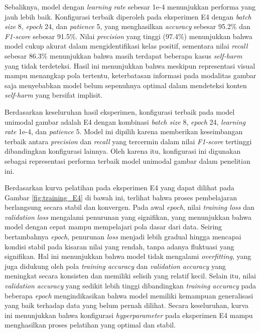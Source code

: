 Sebaliknya, model dengan \textit{learning rate} sebesar 1e-4 menunjukkan performa yang jauh lebih baik. Konfigurasi terbaik diperoleh pada eksperimen E4 dengan \textit{batch size} 8, \textit{epoch} 24, dan \textit{patience} 5, yang menghasilkan \textit{accuracy} sebesar 95.2\% dan \textit{F1-score} sebesar 91.5\%. Nilai \textit{precision} yang tinggi (97.4\%) menunjukkan bahwa model cukup akurat dalam mengidentifikasi kelas positif, sementara nilai \textit{recall} sebesar 86.3\% menunjukkan bahwa masih terdapat beberapa kasus \textit{self-harm} yang tidak terdeteksi. Hasil ini menunjukkan bahwa meskipun representasi visual mampu menangkap pola tertentu, keterbatasan informasi pada modalitas gambar saja menyebabkan model belum sepenuhnya optimal dalam mendeteksi konten \textit{self-harm} yang bersifat implisit.

Berdasarkan keseluruhan hasil eksperimen, konfigurasi terbaik pada model unimodal gambar adalah E4 dengan kombinasi \textit{batch size} 8, \textit{epoch} 24, \textit{learning rate} 1e-4, dan \textit{patience} 5. Model ini dipilih karena memberikan keseimbangan terbaik antara \textit{precision} dan \textit{recall} yang tercermin dalam nilai \textit{F1-score} tertinggi dibandingkan konfigurasi lainnya. Oleh karena itu, konfigurasi ini digunakan sebagai representasi performa terbaik model unimodal gambar dalam penelitian ini.

Berdasarkan kurva pelatihan pada eksperimen E4 yang dapat dilihat pada Gambar \ref{fig:training_E4} di bawah ini, terlihat bahwa proses pembelajaran berlangsung secara stabil dan konvergen. Pada awal \textit{epoch}, nilai \textit{training loss} dan \textit{validation loss} mengalami penurunan yang signifikan, yang menunjukkan bahwa model dengan cepat mampu mempelajari pola dasar dari data. Seiring bertambahnya \textit{epoch}, penurunan \textit{loss} menjadi lebih gradual hingga mencapai kondisi stabil pada kisaran nilai yang rendah, tanpa adanya fluktuasi yang signifikan. Hal ini menunjukkan bahwa model tidak mengalami \textit{overfitting}, yang juga didukung oleh pola \textit{training accuracy} dan \textit{validation accuracy} yang meningkat secara konsisten dan memiliki selisih yang relatif kecil. Selain itu, nilai \textit{validation accuracy} yang sedikit lebih tinggi dibandingkan \textit{training accuracy} pada beberapa \textit{epoch} mengindikasikan bahwa model memiliki kemampuan generalisasi yang baik terhadap data yang belum pernah dilihat. Secara keseluruhan, kurva ini menunjukkan bahwa konfigurasi \textit{hyperparameter} pada eksperimen E4 mampu menghasilkan proses pelatihan yang optimal dan stabil.

